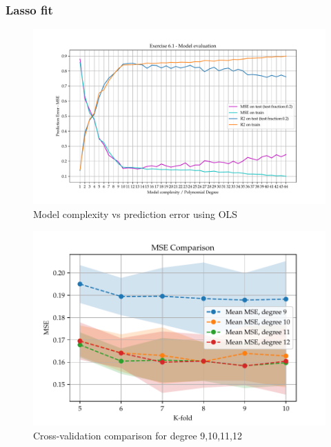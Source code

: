 \documentclass[11pt, a4paper]{article}
\begin{document}
\subsubsection*{Lasso fit}




\begin{figure}
  \centering
  \hspace*{-2cm}
  \includegraphics[scale=0.75]{figures/EX6_EX1_OLS_evaluattion.pdf}
  \caption{Model complexity vs prediction error using OLS}
  \label{fig:EX6_1_OLS_fit}
\end{figure}

\begin{figure}
  \centering
  \includegraphics[scale=1.0]{figures/EX6_mse_cv_fold_compare_degrees.pdf}
  \caption{Cross-validation comparison for degree 9,10,11,12}
  \label{fig:EX6_1_CV}
\end{figure}
\end{document}
